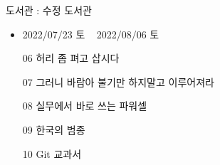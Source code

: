 \documentclass[aspectratio=1610,17pt,xcolor=pdftex,dvipsnames,table,handout]{beamer}
\begin{document}
		\begin{frame} [t,plain]

			\begin{block} { 도서관 : 수정 도서관 }


			\begin{itemize}
			\item 	2022/07/23 토 ~ 2022/08/06 토
			\item 	[06]    허리 좀 펴고 삽시다    
		      \item 	[07]    그러니 바람아 불기만 하지말고 이루어져라
		      \item 	[08]    실무에서 바로 쓰는 파워셀
		      \item 	[09]    한국의 범종
		      \item 	[10]    Git 교과서
			\end{itemize}




			\end{block}			
								
		\end{frame}	 %


%
%
%
%
%								
\end{document}
